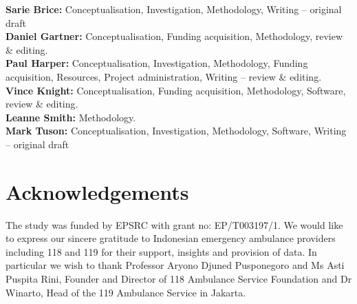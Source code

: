 \documentclass[preprint,12pt]{elsarticle}
\begin{document}
{\bf Sarie Brice:} Conceptualisation, Investigation, Methodology, Writing – original draft\\

{\bf Daniel Gartner:} Conceptualisation, Funding acquisition, Methodology, review \& editing.\\

{\bf Paul Harper:} Conceptualisation, Investigation, Methodology, Funding acquisition, Resources, Project administration, Writing – review \& editing.\\

{\bf Vince Knight:} Conceptualisation, Funding acquisition, Methodology, Software, review \& editing.\\

{\bf Leanne Smith:} Methodology.\\

{\bf Mark Tuson:} Conceptualisation, Investigation, Methodology, Software, Writing – original draft\\



\section*{Acknowledgements}
The study was funded by EPSRC with grant no: EP/T003197/1. We would like to express our sincere gratitude to Indonesian emergency ambulance providers including 118 and 119 for their support, insights and provision of data. In particular we wish to thank Professor Aryono Djuned Pusponegoro and Ms Asti Puspita Rini, Founder and Director of 118 Ambulance Service Foundation and Dr Winarto, Head of the 119 Ambulance Service in Jakarta.



\appendix
\end{document}
